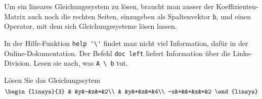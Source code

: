 Um ein lineares Gleichungssystem zu lösen, braucht man ausser
der Koeffizienten-Matrix auch noch die rechten Seiten, einzugeben
als Spaltenvektor {\tt b}, und einen Operator, mit dem sich
Gleichungssysteme lösen lassen.
\begin{teilaufgaben}
\item In der Hilfe-Funktion \verb+help '\'+ findet man nicht
viel Information, dafür in der Online-Dokumentation. Der
Befehl \verb+doc left+ liefert Information über die Links-Division.
Lesen sie nach, was \verb+A \ b+ tut.
\item Lösen Sie das Gleichungssytem
\[
\begin{linsys}{3}
 & &y&-&z&=&2\\
 & &y&+&z&=&4\\
-x&+&&+&z&=&2
\end{linsys}
\]
\end{teilaufgaben}


\begin{loesung}
\begin{teilaufgaben}
\item
\item
{}
\end{teilaufgaben}
\end{loesung}

